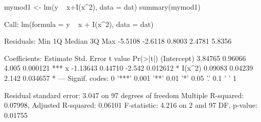 \begin{Schunk}
\begin{Sinput}
 mymod1 <- lm(y ~ x+I(x^2), data = dat)
 summary(mymod1)
\end{Sinput}
\begin{Soutput}
Call:
lm(formula = y ~ x + I(x^2), data = dat)

Residuals:
    Min      1Q  Median      3Q     Max 
-5.5108 -2.6118  0.8003  2.4781  5.8356 

Coefficients:
            Estimate Std. Error t value Pr(>|t|)    
(Intercept)  3.84765    0.96066   4.005 0.000121 ***
x           -1.13643    0.44710  -2.542 0.012612 *  
I(x^2)       0.09083    0.04239   2.142 0.034657 *  
---
Signif. codes:  0 '***' 0.001 '**' 0.01 '*' 0.05 '.' 0.1 ' ' 1

Residual standard error: 3.047 on 97 degrees of freedom
Multiple R-squared:  0.07998,	Adjusted R-squared:  0.06101 
F-statistic: 4.216 on 2 and 97 DF,  p-value: 0.01755
\end{Soutput}
\end{Schunk}

